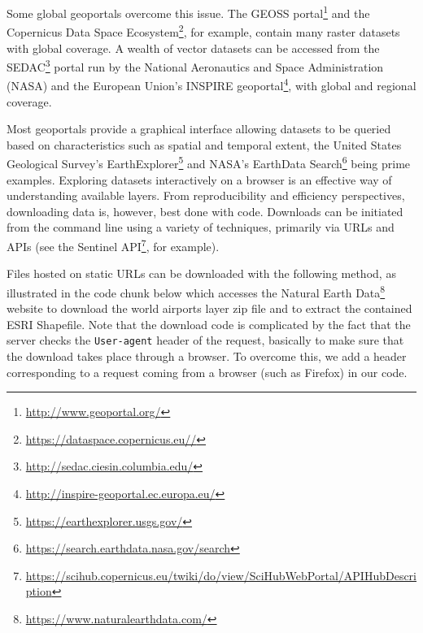 \documentclass[
  letterpaper,
]{krantz}
\begin{document}
Some global geoportals overcome this issue. The GEOSS portal\footnote{\url{http://www.geoportal.org/}}
and the Copernicus Data Space Ecosystem\footnote{\url{https://dataspace.copernicus.eu//}},
for example, contain many raster datasets with global coverage. A wealth
of vector datasets can be accessed from the SEDAC\footnote{\url{http://sedac.ciesin.columbia.edu/}}
portal run by the National Aeronautics and Space Administration (NASA)
and the European Union's INSPIRE geoportal\footnote{\url{http://inspire-geoportal.ec.europa.eu/}},
with global and regional coverage.

Most geoportals provide a graphical interface allowing datasets to be
queried based on characteristics such as spatial and temporal extent,
the United States Geological Survey's EarthExplorer\footnote{\url{https://earthexplorer.usgs.gov/}}
and NASA's EarthData Search\footnote{\url{https://search.earthdata.nasa.gov/search}}
being prime examples. Exploring datasets interactively on a browser is
an effective way of understanding available layers. From reproducibility
and efficiency perspectives, downloading data is, however, best done
with code. Downloads can be initiated from the command line using a
variety of techniques, primarily via URLs and APIs (see the Sentinel
API\footnote{\url{https://scihub.copernicus.eu/twiki/do/view/SciHubWebPortal/APIHubDescription}},
for example).

Files hosted on static URLs can be downloaded with the following method,
as illustrated in the code chunk below which accesses the Natural Earth
Data\footnote{\url{https://www.naturalearthdata.com/}} website to
download the world airports layer zip file and to extract the contained
ESRI Shapefile. Note that the download code is complicated by the fact
that the server checks the \texttt{User-agent} header of the request,
basically to make sure that the download takes place through a browser.
To overcome this, we add a header corresponding to a request coming from
a browser (such as Firefox) in our code.
\end{document}
